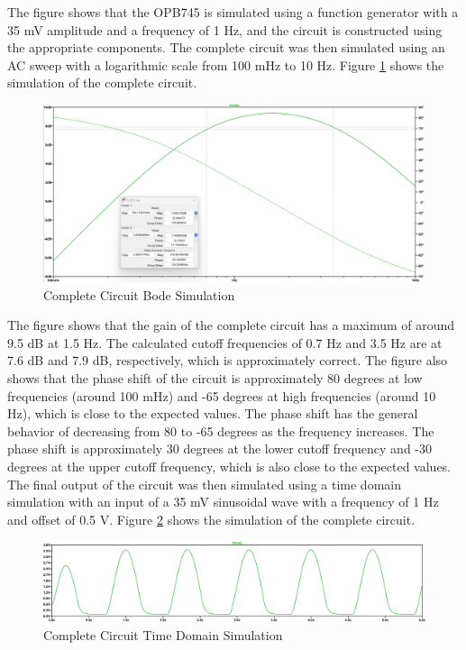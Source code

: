 \documentclass[CMPE]{KGCOEReport}
\begin{document}
The figure shows that the OPB745 is simulated using a function generator with a 35 mV amplitude and a frequency of 1 Hz, and the circuit is constructed using the appropriate components. The complete circuit was then simulated using an AC sweep with a logarithmic scale from 100 mHz to 10 Hz. Figure \ref{fig:completeSim} shows the simulation of the complete circuit.

\begin{figure}[H]
    \centering
    \includegraphics[width=1\textwidth]{SimFreqOutputValues.png}
    \caption{Complete Circuit Bode Simulation}
    \label{fig:completeSim}
\end{figure}

The figure shows that the gain of the complete circuit has a maximum of around 9.5 dB at 1.5 Hz. The calculated cutoff frequencies of 0.7 Hz and 3.5 Hz are at 7.6 dB and 7.9 dB, respectively, which is approximately correct. The figure also shows that the phase shift of the circuit is approximately 80 degrees at low frequencies (around 100 mHz) and -65 degrees at high frequencies (around 10 Hz), which is close to the expected values. The phase shift has the general behavior of decreasing from 80 to -65 degrees as the frequency increases. The phase shift is approximately 30 degrees at the lower cutoff frequency and -30 degrees at the upper cutoff frequency, which is also close to the expected values.\\

The final output of the circuit was then simulated using a time domain simulation with an input of a 35 mV sinusoidal wave with a frequency of 1 Hz and offset of 0.5 V. Figure \ref{fig:timeSim} shows the simulation of the complete circuit.

\begin{figure}[H]
    \centering
    \includegraphics[width=1\textwidth]{SimTimeOutput.png}
    \caption{Complete Circuit Time Domain Simulation}
    \label{fig:timeSim}
\end{figure}
\end{document}
